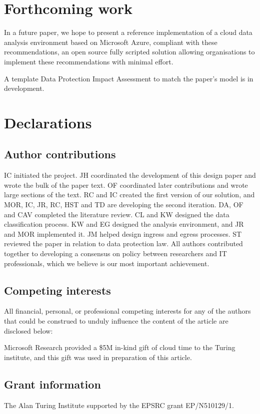 \documentclass[10pt,a4paper,twocolumn]{article}
\begin{document}
\section{Forthcoming work}

In a future paper, we hope to present a reference implementation of a cloud data analysis environment based on Microsoft Azure, compliant with these recommendations, an open source fully scripted solution allowing organisations to implement these recommendations with minimal effort.

A template Data Protection Impact Assessment to match the paper's model is in development.

\section{Declarations}

\subsection*{Author contributions}

IC initiated the project.
JH coordinated the development of this design paper and wrote the bulk of the paper text. 
OF coordinated later contributions and wrote large sections of the text.
RC and IC created the first version of our solution, and MOR, IC, JR, RC, HST and TD are developing the second iteration.
DA, OF and CAV completed the literature review.
CL and KW designed the data classification process.
KW and EG designed the analysis environment, and JR and MOR implemented it. JM helped design ingress and egress processes.
ST reviewed the paper in relation to data protection law.
All authors contributed together to developing a consensus on policy between researchers and IT professionals, which we believe is our most important achievement.

\subsection*{Competing interests}
All financial, personal, or professional competing interests for any of the authors that
could be construed to unduly influence the content of the article are disclosed below:

Microsoft Research provided a \$5M in-kind gift of cloud time to the Turing institute, and this gift was used in preparation of this article.

\subsection*{Grant information}
The Alan Turing Institute supported by the EPSRC grant EP/N510129/1. 
\end{document}
